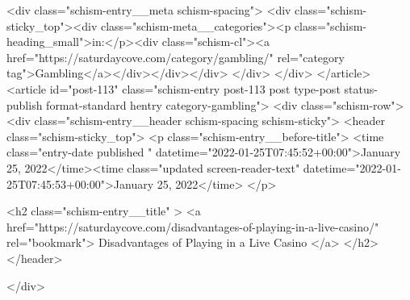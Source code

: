 {		<div class="schism-entry__meta schism-spacing">			<div class="schism-sticky_top"><div class="schism-meta__categories"><p class="schism-heading_small">in:</p><div class="schism-cl"><a href="https://saturdaycove.com/category/gambling/" rel="category tag">Gambling</a></div></div></div>		</div>
	</div>
</article>
<article id="post-113" class="schism-entry post-113 post type-post status-publish format-standard hentry category-gambling">
	<div class="schism-row">		<div class="schism-entry__header schism-spacing schism-sticky">			<header class="schism-sticky_top">				<p class="schism-entry__before-title">
					<time class="entry-date published " datetime="2022-01-25T07:45:52+00:00">January 25, 2022</time><time class="updated screen-reader-text" datetime="2022-01-25T07:45:53+00:00">January 25, 2022</time>				</p>

				<h2 class="schism-entry__title" >
					<a href="https://saturdaycove.com/disadvantages-of-playing-in-a-live-casino/" rel="bookmark">
						Disadvantages of Playing in a Live Casino					</a>
				</h2>
			</header>

					</div>

}
